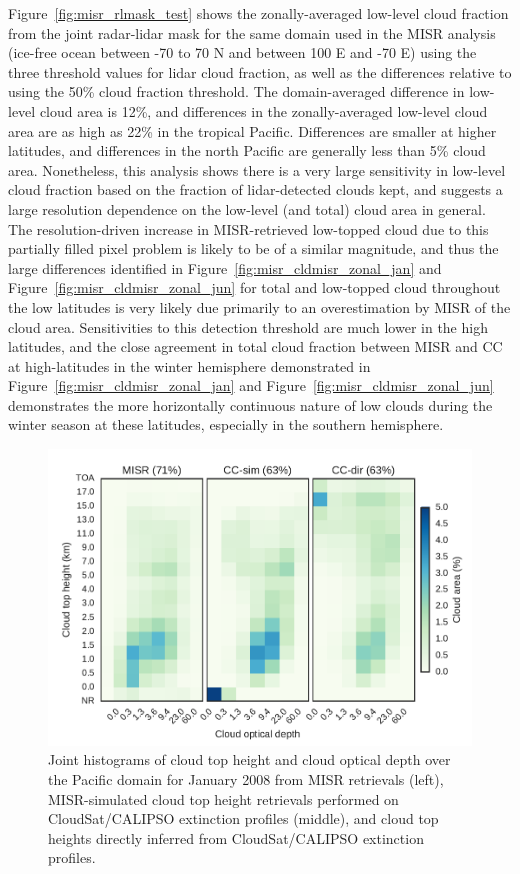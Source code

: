 Figure~\ref{fig:misr_rlmask_test} shows the zonally-averaged low-level
cloud fraction from the joint radar-lidar mask for the same domain used
in the MISR analysis (ice-free ocean between -70 to 70 N and between 100
E and -70 E) using the three threshold values for lidar cloud fraction,
as well as the differences relative to using the 50\% cloud fraction
threshold. The domain-averaged difference in low-level cloud area is
12\%, and differences in the zonally-averaged low-level cloud area are
as high as 22\% in the tropical Pacific. Differences are smaller at
higher latitudes, and differences in the north Pacific are generally
less than 5\% cloud area. Nonetheless, this analysis shows there is a
very large sensitivity in low-level cloud fraction based on the fraction
of lidar-detected clouds kept, and suggests a large resolution
dependence on the low-level (and total) cloud area in general. The
resolution-driven increase in MISR-retrieved low-topped cloud due to
this partially filled pixel problem is likely to be of a similar
magnitude, and thus the large differences identified in
Figure~\ref{fig:misr_cldmisr_zonal_jan} and
Figure~\ref{fig:misr_cldmisr_zonal_jun} for total and low-topped cloud
throughout the low latitudes is very likely due primarily to an
overestimation by MISR of the cloud area. Sensitivities to this
detection threshold are much lower in the high latitudes, and the close
agreement in total cloud fraction between MISR and CC at high-latitudes
in the winter hemisphere demonstrated in
Figure~\ref{fig:misr_cldmisr_zonal_jan} and
Figure~\ref{fig:misr_cldmisr_zonal_jun} demonstrates the more
horizontally continuous nature of low clouds during the winter season at
these latitudes, especially in the southern hemisphere.

\begin{figure}[tp]
\centering
\includegraphics{graphics/misr_clmisr_Pacific_2008-01.pdf}
\caption{\label{fig:misr_cthtau_Pacific_january}Joint histograms of
cloud top height and cloud optical depth over the Pacific domain for
January 2008 from MISR retrievals (left), MISR-simulated cloud top
height retrievals performed on CloudSat/CALIPSO extinction profiles
(middle), and cloud top heights directly inferred from CloudSat/CALIPSO
extinction profiles.}\label{fig:misrux5fcthtauux5fPacificux5fjanuary}
\end{figure}


